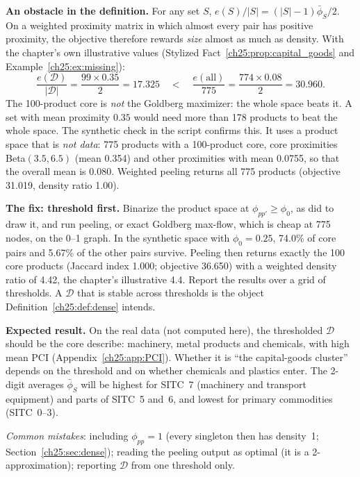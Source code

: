 \documentclass[../solutions_manual.tex]{subfiles}
\begin{document}
 \textbf{An obstacle in the definition.} For any set $S$, $e(S)/|S| = (|S|-1)\bar\phi_S/2$. On a weighted proximity matrix in which almost every pair has positive proximity, the objective therefore rewards \emph{size} almost as much as density. With the chapter's own illustrative values (Stylized Fact~\ref{ch25:prop:capital_goods} and Example~\ref{ch25:ex:missing}):
\[
\frac{e(\mathcal{D})}{|\mathcal{D}|} = \frac{99 \times 0.35}{2} = 17.325
\quad<\quad
\frac{e(\text{all})}{775} = \frac{774 \times 0.08}{2} = 30.960 .
\]
The 100-product core is \emph{not} the Goldberg maximizer: the whole space beats it. A set with mean proximity $0.35$ would need more than 178 products to beat the whole space. The synthetic check in the script confirms this. It uses a product space that is \emph{not data}: 775 products with a 100-product core, core proximities Beta$(3.5, 6.5)$ (mean 0.354) and other proximities with mean 0.0755, so that the overall mean is 0.080. Weighted peeling returns all 775 products (objective 31.019, density ratio 1.00).

 \textbf{The fix: threshold first.} Binarize the product space at $\phi_{pp'} \ge \phi_0$, as \citet{hidalgo2007product} did to draw it, and run peeling, or exact Goldberg max-flow, which is cheap at 775 nodes, on the 0--1 graph. In the synthetic space with $\phi_0 = 0.25$, 74.0\% of core pairs and 5.67\% of the other pairs survive. Peeling then returns exactly the 100 core products (Jaccard index 1.000; objective 36.650) with a weighted density ratio of 4.42, the chapter's illustrative 4.4. Report the results over a grid of thresholds. A $\mathcal{D}$ that is stable across thresholds is the object Definition~\ref{ch25:def:dense} intends.

 \textbf{Expected result.} On the real data (not computed here), the thresholded $\mathcal{D}$ should be the core \citet{hidalgo2007product} describe: machinery, metal products and chemicals, with high mean PCI (Appendix~\ref{ch25:app:PCI}). Whether it is ``the capital-goods cluster'' depends on the threshold and on whether chemicals and plastics enter. The 2-digit averages $\bar\phi_S$ will be highest for SITC~7 (machinery and transport equipment) and parts of SITC~5 and~6, and lowest for primary commodities (SITC~0--3).

\emph{Common mistakes}: including $\phi_{pp} = 1$ (every singleton then has density~1; Section~\ref{ch25:sec:dense}); reading the peeling output as optimal (it is a 2-approximation); reporting $\mathcal{D}$ from one threshold only.
\end{document}
